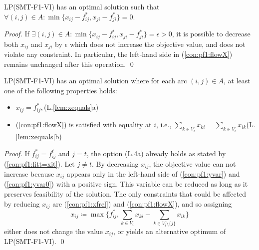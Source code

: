 \begin{lemma}\label{lem:oneslack} LP(SMT-F1-VI) has an optimal solution such that \newline
$\forall (i,j)\in A: \min\{x_{ij} - f^*_{ij}, x_{ji}-f^*_{ji}\}=0$.
\end{lemma}
\begin{proof}
If $\exists (i,j)\in A: \min\{x_{ij} - f^*_{ij}, x_{ji}-f^*_{ji}\}=\epsilon>0$, it is possible to decrease both $x_{ij}$ and $x_{ji}$ by $\epsilon$ which does not increase the objective value, and does not violate any constraint. In particular, the left-hand side in (\ref{con:pf1:flowX}) remains unchanged after this operation.  \qed
\end{proof}
\begin{lemma}\label{lem:xequals} LP(SMT-F1-VI) has an optimal solution where for each arc $(i,j)\in A$, at least one of the following properties holds:

\begin{itemize}
\item\label{lem:item:noslack} $x_{ij}=f^*_{ij},$\hfill(L.\ref{lem:xequals}a)
\item\label{lem:item:slack} %
(\ref{con:pf1:flowX}) is satisfied with equality at $i$, i.e., $\sum_{k\in V_{i}}x_{ki}=\sum_{k\in V_i}x_{ik}$\hfill(L.\ref{lem:xequals}b)
\end{itemize}

\end{lemma}
\begin{proof}
If $f^*_{ij}=f^t_{ij}$ and $j=t$, the option (L.4a) already holds as stated by (\ref{con:pf1:fitt=xit}). Let $j\neq t$. By decreasing $x_{ij}$, the objective value can not increase because $x_{ij}$ appears only in the left-hand side of (\ref{con:pf1:yvar}) and (\ref{con:pf1:yvar0}) with a positive sign. This variable can be reduced as long as it preserves feasibility of the solution. The only constraints that could be affected by reducing $x_{ij}$ are (\ref{con:pf1:xfrel}) and (\ref{con:pf1:flowX}), and so assigning 
$$x_{ij}\coloneqq\max\bigg\{ f^*_{ij},\sum_{k\in V_i}x_{ki}-\sum_{k\in V_i\setminus\{j\}}x_{ik}\bigg\}$$
either does not change the value $x_{ij}$, or yields an alternative optimum of LP(SMT-F1-VI). \qed
\end{proof}
